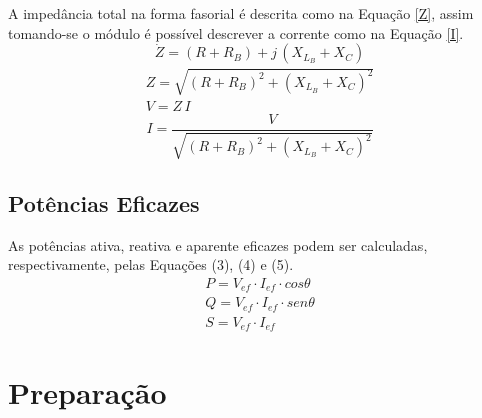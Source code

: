 \documentclass[a4paper,12pt,oneside,openany,table,xcdraw]{article}
\begin{document}
A impedância total na forma fasorial é descrita como na Equação \ref{Z}, assim tomando-se o módulo é possível descrever a corrente como na Equação \ref{I}.
\begin{equation}\label{Z}
\dot{Z}=(R+R_{B}) + j\, (X_{L_{B}}+ X_{C})
\end{equation}
\begin{gather*}
Z = \sqrt{(R+R_{B})^2 + (X_{L_{B}}+ X_{C})^2 } \\
V = Z\, I
\end{gather*}
\begin{equation}\label{I}
I = \dfrac{V}{\sqrt{(R+R_{B})^2 + (X_{L_{B}}+ X_{C})^2 }}
\end{equation}

\subsection{Potências Eficazes}
As potências ativa, reativa e aparente eficazes podem ser calculadas, respectivamente, pelas Equações (3), (4) e (5). 
\begin{gather}
P=V_{ef}\cdot I_{ef}\cdot cos\theta\\
Q=V_{ef}\cdot I_{ef}\cdot sen\theta\\
S=V_{ef}\cdot I_{ef}
\end{gather}

\section{Preparação}
\end{document}
